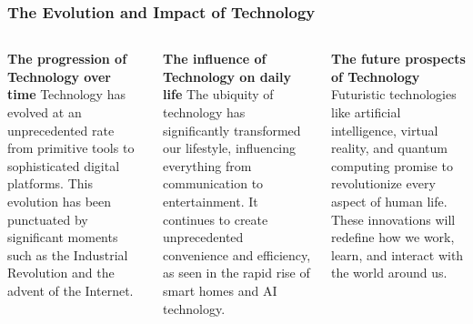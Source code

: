 \documentclass[5pt]{beamer}
\begin{document}
\begin{frame}
\frametitle{The Evolution and Impact of Technology}
\begin{columns}
\begin{column}{0.3\textwidth}
\begin{block}{\textbf{The progression of Technology over time}}
Technology has evolved at an unprecedented rate from primitive tools to sophisticated digital platforms. This evolution has been punctuated by significant moments such as the Industrial Revolution and the advent of the Internet.
\end{block}
\end{column}
\begin{column}{0.3\textwidth}
\begin{block}{\textbf{The influence of Technology on daily life}}
The ubiquity of technology has significantly transformed our lifestyle, influencing everything from communication to entertainment. It continues to create unprecedented convenience and efficiency, as seen in the rapid rise of smart homes and AI technology.
\end{block}
\end{column}
\begin{column}{0.3\textwidth}
\begin{block}{\textbf{The future prospects of Technology}}
Futuristic technologies like artificial intelligence, virtual reality, and quantum computing promise to revolutionize every aspect of human life. These innovations will redefine how we work, learn, and interact with the world around us.
\end{block}
\end{column}
\end{columns}
\end{frame}
\end{document}
